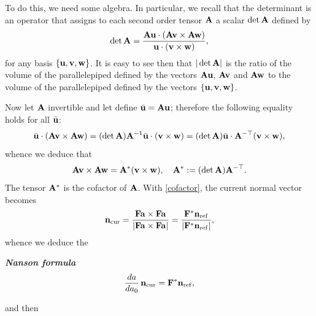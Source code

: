 To do this, we need some algebra. In particular, we recall that the determinant is an operator that assigns to each second order tensor $\mathbf{A}$ a scalar $\det\mathbf{A}$ defined by
\begin{equation}\label{det}
	\det\mathbf{A}=\frac{\mathbf{A}\mathbf{u}\cdot(\mathbf{A}\mathbf{v}\times \mathbf{A}\mathbf{w})}{\mathbf{u}\cdot(\mathbf{v}\times \mathbf{w})},
\end{equation}
for any basis $\{\mathbf{u},\mathbf{v},\mathbf{w}\}$. It is easy to see then that $|\det\mathbf{A}|$ is the ratio of the volume of the parallelepiped defined by the vectors $\mathbf{A}\mathbf{u}$, $\mathbf{A}\mathbf{v}$ and $\mathbf{A}\mathbf{w}$ to the volume of the parallelepiped defined by the vectors $\{\mathbf{u},\mathbf{v},\mathbf{w}\}$. 

Now let $\mathbf{A}$ invertible and let define $\bar{\mathbf{u}}=\mathbf{A} \mathbf{u}$; therefore the following equality holds for all $\bar{\mathbf{u}}$:
\begin{equation}
\bar{\mathbf{u}} \cdot( \mathbf{A} \mathbf{v}\times\mathbf{A}\mathbf{w})=(\det\mathbf{A})\mathbf{A}^{-1} \bar{\mathbf{u}}\cdot (\mathbf{v}\times\mathbf{w})=(\det\mathbf{A})\bar{\mathbf{u}}\cdot\mathbf{A}^{-\top}(\mathbf{v}\times\mathbf{w}),
\end{equation}
 whence we deduce that
%
%
%
\begin{equation}\label{cofactor}
	\mathbf{A} \mathbf{v}\times \mathbf{A} \mathbf{w} =\mathbf{A}^*(\mathbf{v}\times\mathbf{w}), \quad \mathbf{A}^*:=(\det\mathbf{A})\mathbf{A}{^{-\top}}.
\end{equation}
The tensor $\mathbf{A}^*$ is the cofactor of $\mathbf{A}$. With \eqref{cofactor}, the current normal vector becomes
\begin{equation}
	\mathbf{n}_{\rm cur}=\frac{\mathbf{F}\mathbf{a}\times\mathbf{F}\mathbf{a}}{|\mathbf{F}\mathbf{a}\times\mathbf{F}\mathbf{a}|}=\frac{\mathbf{F}^*\mathbf{n}_{\rm ref}}{|\mathbf{F}^*\mathbf{n}_{\rm ref}|},
\end{equation}
whence we deduce the
\begin{definition}
	 \textit{\textbf{Nanson formula}}
	\begin{equation}\label{nanson}
\frac{da}{da_0}\,\mathbf{n}_{\rm cur}=\mathbf{F}^*\mathbf{n}_{\rm ref},
\end{equation}
\end{definition}
and then

